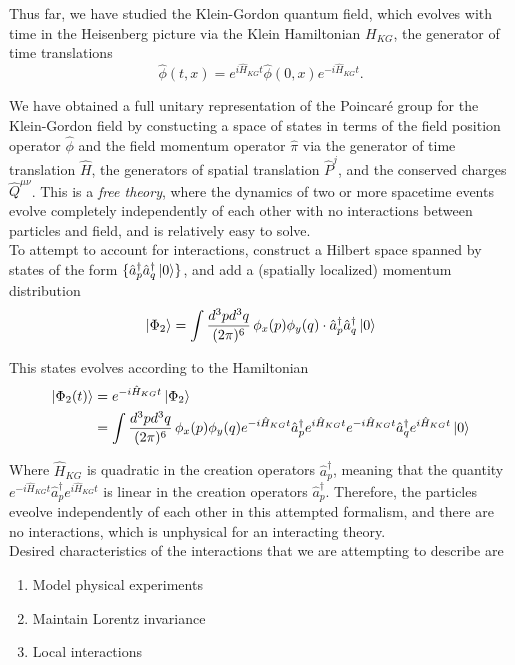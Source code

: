 \noindent Thus far, we have studied the Klein-Gordon quantum field, which evolves with time in the Heisenberg picture via the Klein Hamiltonian $H_{KG}$, the generator of time translations
\begin{equation}
\hat{\phi}(t,x) = e^{i\hat{H}_{KG}t} \hat{\phi}(0,x) e^{-i\hat{H}_{KG}t}.
\end{equation}

\noindent We have obtained a full unitary representation of the Poincar\'e group for the Klein-Gordon field by constucting a space of states in terms of the field position operator $\hat{\phi}$ and the field momentum operator $\hat{\pi}$ via the generator of time translation $\hat{H}$, the generators of spatial translation $\hat{P}^j$, and the conserved charges $\hat{Q}^{\mu\nu}$. This is a \textit{free theory}, where the dynamics of two or more spacetime events evolve completely independently of each other with no interactions between particles and field, and is relatively easy to solve. \\

\noindent To attempt to account for interactions, construct a Hilbert space spanned by states of the form $\{  \hat{a}_p^\dagger \hat{a}_q^\dagger \ket{0} \}$, and add a (spatially localized) momentum distribution
\begin{equation}
\ket{\Phi_2} = \int \frac{d^3 p d^3 q}{(2\pi)^6} \, \phi_x(p) \phi_y(q) \cdot \hat{a}_p^\dagger \hat{a}_q^\dagger \ket{0}
\end{equation}

\noindent This states evolves according to the Hamiltonian
\begin{align}
\ket{\Phi_2(t)} &= e^{-i\hat{H}_{KG}t} \ket{\Phi_2} \\
&= \int \frac{d^3 p d^3 q}{(2\pi)^6} \, \phi_x(p) \phi_y(q) e^{-i\hat{H}_{KG}t} \hat{a}_p^\dagger e^{i\hat{H}_{KG}t} e^{-i\hat{H}_{KG}t}  \hat{a}_q^\dagger e^{i\hat{H}_{KG}t}  \ket{0}
\end{align}

\noindent Where $\hat{H}_{KG}$ is quadratic in the creation operators $\hat{a}_p^\dagger$, meaning that the quantity $e^{-i\hat{H}_{KG}t} \hat{a}_p^\dagger e^{i\hat{H}_{KG}t}$ is linear in the creation operators $\hat{a}_p^\dagger$. Therefore, the particles eveolve independently of each other in this attempted formalism, and there are no interactions, which is unphysical for an interacting theory. \\

\noindent Desired characteristics of the interactions that we are attempting to describe are
\begin{enumerate}
\item Model physical experiments
\item Maintain Lorentz invariance
\item Local interactions
\end{enumerate}


